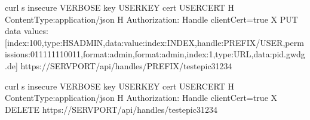 \documentclass[a4paper,10pt,english]{sphinxmanual}
\begin{document}
\begin{sphinxVerbatim}[commandchars=\\\{\}]
curl \PYGZhy{}s \PYGZhy{}\PYGZhy{}insecure \PYGZdl{}\PYGZob{}VERBOSE\PYGZcb{} \PYGZhy{}\PYGZhy{}key \PYGZdl{}\PYGZob{}USERKEY\PYGZcb{} \PYGZhy{}\PYGZhy{}cert \PYGZdl{}\PYGZob{}USERCERT\PYGZcb{} \PYGZhy{}H \PYGZdq{}Content\PYGZhy{}Type:application/json\PYGZdq{} \PYGZhy{}H \PYGZsq{}Authorization: Handle clientCert=\PYGZdq{}true\PYGZdq{}\PYGZsq{} \PYGZhy{}X PUT \PYGZhy{}\PYGZhy{}data  \PYGZsq{}\PYGZob{}\PYGZdq{}values\PYGZdq{}:[\PYGZob{}\PYGZdq{}index\PYGZdq{}:100,\PYGZdq{}type\PYGZdq{}:\PYGZdq{}HS\PYGZus{}ADMIN\PYGZdq{},\PYGZdq{}data\PYGZdq{}:\PYGZob{}\PYGZdq{}value\PYGZdq{}:\PYGZob{}\PYGZdq{}index\PYGZdq{}:\PYGZsq{}\PYGZdl{}\PYGZob{}INDEX\PYGZcb{}\PYGZsq{},\PYGZdq{}handle\PYGZdq{}:\PYGZdq{}\PYGZsq{}\PYGZdl{}\PYGZob{}PREFIX\PYGZcb{}\PYGZsq{}\PYGZbs{}/\PYGZsq{}\PYGZdl{}\PYGZob{}USER\PYGZcb{}\PYGZsq{}\PYGZdq{},\PYGZdq{}permissions\PYGZdq{}:\PYGZdq{}011111110011\PYGZdq{},\PYGZdq{}format\PYGZdq{}:\PYGZdq{}admin\PYGZdq{}\PYGZcb{},\PYGZdq{}format\PYGZdq{}:\PYGZdq{}admin\PYGZdq{}\PYGZcb{}\PYGZcb{},\PYGZob{}\PYGZdq{}index\PYGZdq{}:1,\PYGZdq{}type\PYGZdq{}:\PYGZdq{}URL\PYGZdq{},\PYGZdq{}data\PYGZdq{}:\PYGZdq{}pid.gwdg.de\PYGZdq{}\PYGZcb{}]\PYGZcb{}\PYGZsq{} https://\PYGZdl{}\PYGZob{}SERVPORT\PYGZcb{}/api/handles/\PYGZdl{}\PYGZob{}PREFIX\PYGZcb{}/test\PYGZus{}epic3\PYGZus{}1234
\end{sphinxVerbatim}


\begin{sphinxVerbatim}[commandchars=\\\{\}]
curl \PYGZhy{}s \PYGZhy{}\PYGZhy{}insecure \PYGZdl{}\PYGZob{}VERBOSE\PYGZcb{} \PYGZhy{}\PYGZhy{}key \PYGZdl{}\PYGZob{}USERKEY\PYGZcb{} \PYGZhy{}\PYGZhy{}cert \PYGZdl{}\PYGZob{}USERCERT\PYGZcb{} \PYGZhy{}H \PYGZdq{}Content\PYGZhy{}Type:application/json\PYGZdq{} \PYGZhy{}H \PYGZsq{}Authorization: Handle clientCert=\PYGZdq{}true\PYGZdq{}\PYGZsq{} \PYGZhy{}X DELETE  https://\PYGZdl{}\PYGZob{}SERVPORT\PYGZcb{}/api/handles/test\PYGZus{}epic3\PYGZus{}1234
\end{sphinxVerbatim}



\renewcommand{\indexname}{Index}
\printindex
\end{document}
